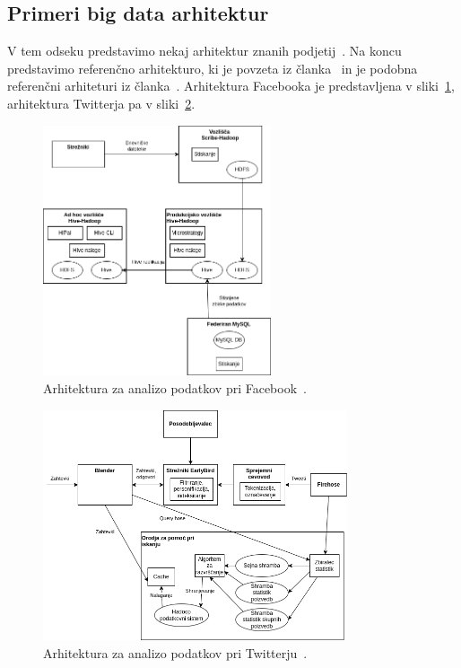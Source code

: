 \subsection{Primeri big data arhitektur}

V tem odseku predstavimo nekaj arhitektur znanih podjetij~\cite{reference_architecture_classification_technologies}.
Na koncu predstavimo referenčno arhitekturo,
ki je povzeta iz članka~\cite{reference_architecture_classification_technologies} in je
podobna referenčni arhiteturi iz članka~\cite{reference_architecture_bd}.
Arhitektura Facebooka je predstavljena v sliki~\ref{fig:arch-facebook}, arhitektura Twitterja pa v sliki~\ref{fig:arch-twitter}.

\begin{figure}[H]
    \centering
    \includegraphics[width=0.6\textwidth]{img/arhitektura/podjetja/facebook.png}
    \caption{Arhitektura za analizo podatkov pri Facebook~\cite{reference_architecture_classification_technologies}.}
    \label{fig:arch-facebook}
\end{figure}

\begin{figure}[H]
    \centering
    \includegraphics[width=0.8\textwidth]{img/arhitektura/podjetja/twitter.png}
    \caption{Arhitektura za analizo podatkov pri Twitterju~\cite{reference_architecture_classification_technologies}.}
    \label{fig:arch-twitter}
\end{figure}


